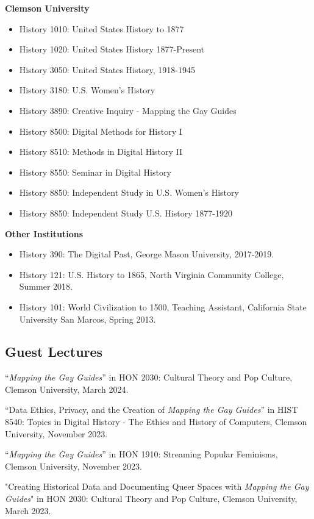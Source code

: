 \documentclass[11pt]{article}
\begin{document}
\textbf{Clemson University}
\begin{itemize}
  \itemsep0em 
  \item History 1010: United States History to 1877
  \item History 1020: United States History 1877-Present
  \item History 3050: United States History, 1918-1945
  \item History 3180: U.S. Women's History
  \item History 3890: Creative Inquiry - Mapping the Gay Guides
  \item History 8500: Digital Methods for History I
  \item History 8510: Methods in Digital History II
  \item History 8550: Seminar in Digital History
  \item History 8850: Independent Study in U.S. Women's History
  \item History 8850: Independent Study U.S. History 1877-1920
\end{itemize}
\textbf{Other Institutions}
\begin{itemize}
  \itemsep0em 
  \item History 390: The Digital Past, George Mason University, 2017-2019.
  \item History 121: U.S. History to 1865, North Virginia Community College, Summer 2018.
  \item History 101: World Civilization to 1500, Teaching Assistant, California State University San Marcos, Spring 2013.
\end{itemize}

\subsection{Guest Lectures}
``\emph{Mapping the Gay Guides}'' in HON 2030: Cultural Theory and Pop Culture, Clemson University, March 2024.

``Data Ethics, Privacy, and the Creation of \emph{Mapping the Gay Guides}'' in HIST 8540: Topics in Digital History - The Ethics and History of Computers, Clemson University, November 2023.

``\emph{Mapping the Gay Guides}'' in HON 1910: Streaming Popular Feminisms, Clemson University, November 2023.

"Creating Historical Data and Documenting Queer Spaces with \emph{Mapping the Gay Guides}" in HON 2030: Cultural Theory and Pop Culture, Clemson University, March 2023.
\end{document}
